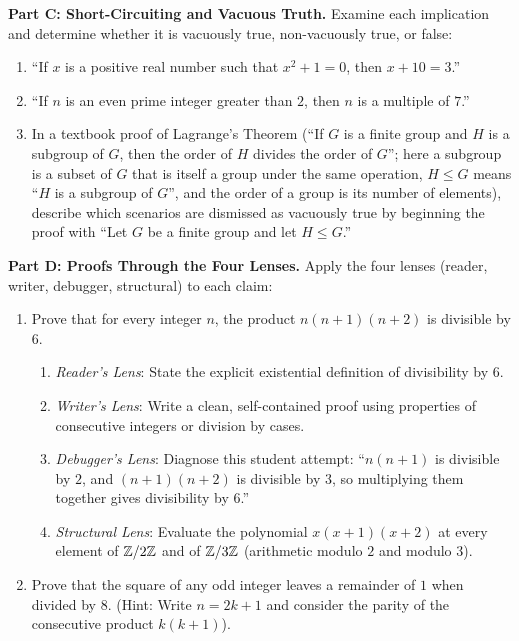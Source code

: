 \textbf{Part C: Short-Circuiting and Vacuous Truth.} Examine each implication and determine whether it is vacuously true, non-vacuously true, or false:
\begin{enumerate}[resume]
\item ``If $x$ is a positive real number such that $x^2 + 1 = 0$, then $x + 10 = 3$.''
\item ``If $n$ is an even prime integer greater than $2$, then $n$ is a multiple of $7$.''
\item In a textbook proof of Lagrange's Theorem (``If $G$ is a finite group and $H$ is a subgroup of $G$, then the order of $H$ divides the order of $G$''; here a subgroup is a subset of $G$ that is itself a group under the same operation, $H \le G$ means ``$H$ is a subgroup of $G$'', and the order of a group is its number of elements), describe which scenarios are dismissed as vacuously true by beginning the proof with ``Let $G$ be a finite group and let $H \le G$.''
\end{enumerate}

\textbf{Part D: Proofs Through the Four Lenses.} Apply the four lenses (reader, writer, debugger, structural) to each claim:
\begin{enumerate}[resume]
\item Prove that for every integer $n$, the product $n(n+1)(n+2)$ is divisible by $6$.
\begin{enumerate}
\item \emph{Reader's Lens}: State the explicit existential definition of divisibility by $6$.
\item \emph{Writer's Lens}: Write a clean, self-contained proof using properties of consecutive integers or division by cases.
\item \emph{Debugger's Lens}: Diagnose this student attempt: ``$n(n+1)$ is divisible by $2$, and $(n+1)(n+2)$ is divisible by $3$, so multiplying them together gives divisibility by $6$.''
\item \emph{Structural Lens}: Evaluate the polynomial $x(x+1)(x+2)$ at every element of $\mathbb{Z}/2\mathbb{Z}$ and of $\mathbb{Z}/3\mathbb{Z}$ (arithmetic modulo $2$ and modulo $3$).
\end{enumerate}
\item Prove that the square of any odd integer leaves a remainder of $1$ when divided by $8$. (Hint: Write $n = 2k + 1$ and consider the parity of the consecutive product $k(k+1)$).
\end{enumerate}


